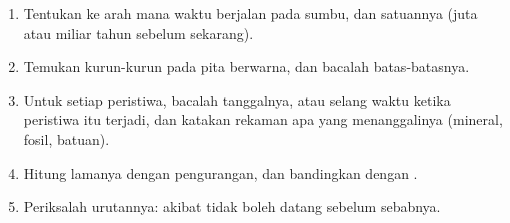 \begin{method}\label{met:g12:early-earth:timeline}
\begin{enumerate}
  \item Tentukan ke arah mana waktu berjalan pada sumbu, dan satuannya (juta
        atau miliar tahun sebelum sekarang).
  \item Temukan kurun-kurun pada pita berwarna, dan bacalah batas-batasnya.
  \item Untuk setiap peristiwa, bacalah tanggalnya, atau selang waktu ketika
        peristiwa itu terjadi, dan katakan rekaman apa yang menanggalinya
        (mineral, fosil, batuan).
  \item Hitung lamanya dengan pengurangan, dan bandingkan dengan .
  \item Periksalah urutannya: akibat tidak boleh datang sebelum sebabnya.
\end{enumerate}
\end{method}

